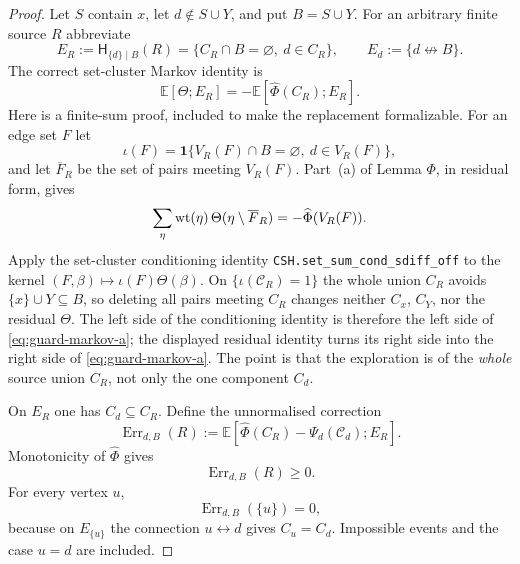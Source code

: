 \documentclass[11pt]{article}
\theoremstyle{definition}
\theoremstyle{remark}
\newcommand{\EE}{\mathbb E}
\newcommand{\one}{\mathbf 1}
\newcommand{\cC}{\mathcal C}
\newcommand{\con}{\leftrightarrow}
\newcommand{\ncon}{\not\leftrightarrow}
\newcommand{\lean}[1]{\texttt{#1}}
\begin{document}
\begin{proof}
Let $S$ contain $x$, let $d\notin S\cup Y$, and put $B=S\cup Y$.  For an
arbitrary finite source $R$ abbreviate
\[
 E_R:=\mathsf H_{\{d\}\mid B}(R)
     =\{C_R\cap B=\varnothing,\ d\in C_R\},
 \qquad E_d:=\{d\ncon B\}.
\]
The correct set-cluster Markov identity is
\begin{equation}\label{eq:guard-markov-a}
 \EE[\Theta;E_R]=-\EE[\widehat\Phi(C_R);E_R].
\end{equation}
Here is a finite-sum proof, included to make the replacement formalizable.
For an edge set $F$ let
\[
 \iota(F)=\one\{V_R(F)\cap B=\varnothing,\ d\in V_R(F)\},
\]
and let $\overline F_R$ be the set of pairs meeting $V_R(F)$.  Part~(a)
of Lemma $\Phi$, in residual form, gives
\[
 \sum_\eta {\rm wt}(\eta)\,
   \Theta(\eta\setminus\overline F_R)
 =-\widehat\Phi(V_R(F)).
\]
Apply the set-cluster conditioning identity
\lean{CSH.set\_sum\_cond\_sdiff\_off} to the kernel
$(F,\beta)\mapsto\iota(F)\Theta(\beta)$.  On
$\{\iota(\cC_R)=1\}$ the whole union $C_R$ avoids
$\{x\}\cup Y\subseteq B$, so deleting all pairs meeting $C_R$ changes
neither $C_x$, $C_Y$, nor the residual $\Theta$.  The left side of the
conditioning identity is therefore the left side of
\eqref{eq:guard-markov-a}; the displayed residual identity turns its
right side into the right side of \eqref{eq:guard-markov-a}.  The point
is that the exploration is of the \emph{whole} source union $C_R$, not
only the one component $C_d$.

On $E_R$ one has $C_d\subseteq C_R$.  Define the unnormalised correction
\begin{equation}\label{eq:guard-error}
 \operatorname{Err}_{d,B}(R):=
 \EE\!\left[
   \widehat\Phi(C_R)-\Psi_d(\cC_d);E_R\right].
\end{equation}
Monotonicity of $\widehat\Phi$ gives
\begin{equation}\label{eq:guard-error-sign}
 \operatorname{Err}_{d,B}(R)\geq0.
\end{equation}
For every vertex $u$,
\begin{equation}\label{eq:guard-error-singleton}
 \operatorname{Err}_{d,B}(\{u\})=0,
\end{equation}
because on $E_{\{u\}}$ the connection $u\con d$ gives $C_u=C_d$.
Impossible events and the case $u=d$ are included.


\end{proof}
\end{document}
